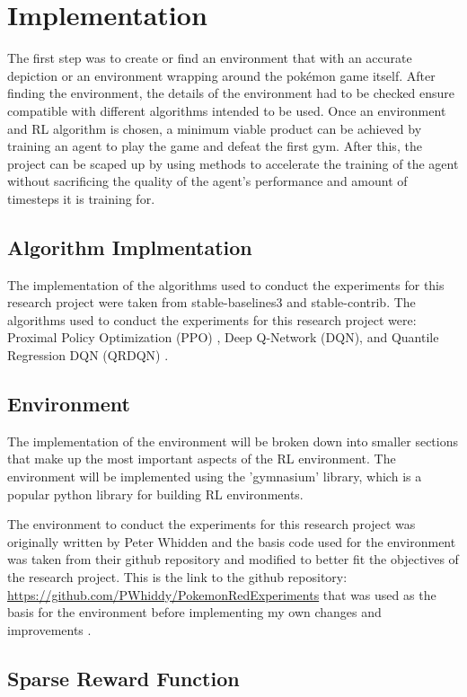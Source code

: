 \section{Implementation}

The first step was to create or find an environment that with an accurate depiction or an environment wrapping around the pokémon game itself. After finding the environment, the details of the environment had to be checked ensure compatible with different algorithms intended to be used. Once an environment and RL algorithm is chosen, a minimum viable product can be achieved by training an agent to play the game and defeat the first gym. After this,  the project can be scaped up by using methods to accelerate the training of the agent without sacrificing the quality of the agent's performance and amount of timesteps it is training for. 

\subsection{Algorithm Implmentation}

The implementation of the algorithms used to conduct the experiments for this research project were taken from stable-baselines3 and stable-contrib. The algorithms used to conduct the experiments for this research project were: Proximal Policy Optimization (PPO) , Deep Q-Network (DQN), and Quantile Regression DQN (QRDQN) \cite{stablebaselines3}. 

\subsection{Environment}

The implementation of the environment will be broken down into smaller sections that make up the most important aspects of the RL environment. The environment will be implemented using the 'gymnasium' library, which is a popular python library for building RL environments.

The environment to conduct the experiments for this research project was originally written by Peter Whidden and the basis code used for the environment was taken from their github repository and modified to better fit the objectives of the research project. This is the link to the github repository: \url{https://github.com/PWhiddy/PokemonRedExperiments} that was used as the basis for the environment before implementing my own changes and improvements \cite{PWhiddy2023}.

\subsection{Sparse Reward Function}

